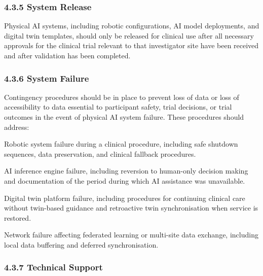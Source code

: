 \subsubsection{4.3.5 System Release}

Physical AI systems, including robotic configurations, AI model deployments, and digital twin templates, should only be released for clinical use after all necessary approvals for the clinical trial relevant to that investigator site have been received and after validation has been completed.

\subsubsection{4.3.6 System Failure}

Contingency procedures should be in place to prevent loss of data or loss of accessibility to data essential to participant safety, trial decisions, or trial outcomes in the event of physical AI system failure. These procedures should address:

\begin{description}[leftmargin=2.5cm,style=sameline]

\item[(a)] Robotic system failure during a clinical procedure, including safe shutdown sequences, data preservation, and clinical fallback procedures.

\item[(b)] AI inference engine failure, including reversion to human-only decision making and documentation of the period during which AI assistance was unavailable.

\item[(c)] Digital twin platform failure, including procedures for continuing clinical care without twin-based guidance and retroactive twin synchronisation when service is restored.

\item[(d)] Network failure affecting federated learning or multi-site data exchange, including local data buffering and deferred synchronisation.

\end{description}

\subsubsection{4.3.7 Technical Support}

